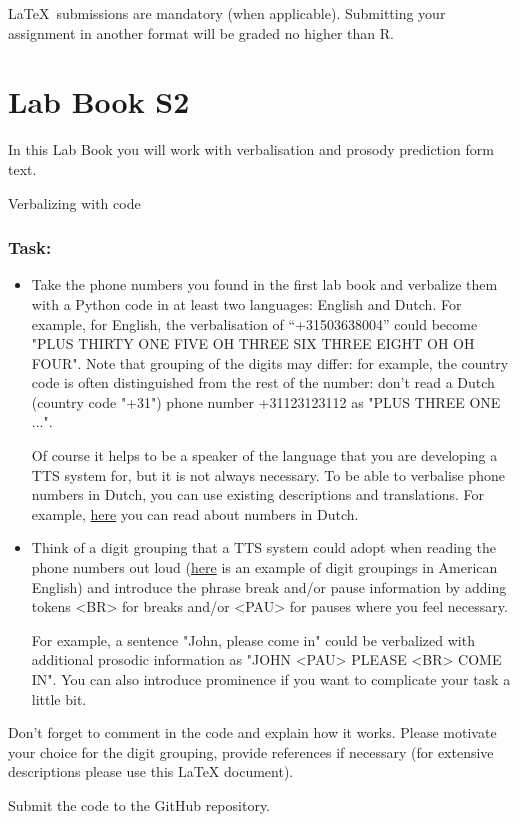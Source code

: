 \documentclass{../labbook}
\begin{document}
\begin{mdframed}[backgroundcolor=blue!20]
\LaTeX ~submissions are mandatory (when applicable). Submitting your assignment in another format will be graded no higher than R.
\end{mdframed}

\section{Lab Book S2}
In this Lab Book you will work with verbalisation and prosody prediction form text. 

\begin{problem}{1}{10}{Verbalizing with code}

\subsubsection*{Task:}
\begin{itemize}
	\item Take the phone numbers you found in the first lab book and verbalize them with a Python code in at least two languages: English and Dutch.
For example, for English, the verbalisation of ``+31503638004'' could become "PLUS THIRTY ONE FIVE OH THREE SIX THREE EIGHT OH OH FOUR".
Note that grouping of the digits may differ: for example, the country code is often distinguished from the rest of the number:
don't read a Dutch (country code "+31") phone number +31123123112  as "PLUS THREE ONE ...".

Of course it helps to be a speaker of the language that you are developing a TTS system for, but it is not always necessary. To be able to verbalise phone numbers in Dutch, you can use existing descriptions and translations. For example, \href{https://www.dutchpod101.com/blog/2019/10/24/dutch-numbers/}{here} you can read about numbers in Dutch.

\item Think of a digit grouping that a TTS system could adopt when reading the phone numbers out loud (\href{https://youtu.be/2OX8znJHNo0?si=EG2d8ElbaailUEhU}{here} is an example of digit groupings in American English)
and introduce the phrase break and/or pause information by adding tokens <BR> for breaks and/or <PAU> for pauses where you feel necessary. 

For example, a sentence "John, please come in" could be verbalized with additional prosodic information as "JOHN <PAU> PLEASE <BR> COME IN".
You can also introduce prominence if you want to complicate your task a little bit.

\end{itemize}




Don't forget to comment in the code and explain how it works. Please motivate your choice for the digit grouping, provide references if necessary (for extensive descriptions please use this LaTeX document).

Submit the code to the GitHub repository. 
 \end{problem}
\end{document}
